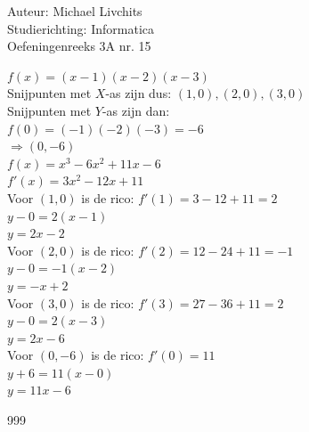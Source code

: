 \documentclass[a4paper]{article}
\begin{document}
  
\noindent \large Auteur: Michael Livchits \\
\noindent \large Studierichting: Informatica\\
\noindent \large Oefeningenreeks 3A nr. 15\\

\medskip

\normalsize

$f(x)=(x-1)(x-2)(x-3)$\\

Snijpunten met $X$-as zijn dus: $(1,0), (2,0), (3,0)$\\

Snijpunten met $Y$-as zijn dan:\\

$f(0)=(-1)(-2)(-3)=-6$\\

$\Rightarrow (0,-6)$\\

$f(x)=x^3-6x^2+11x-6$\\

$f'(x)=3x^2-12x+11$\\

Voor $(1,0)$ is de rico: $f'(1)=3-12+11=2$\\

$y-0=2(x-1)$\\

$y=2x-2$\\

Voor $(2,0)$ is de rico: $f'(2)=12-24+11=-1$\\

$y-0=-1(x-2)$\\

$y=-x+2$\\

Voor $(3,0)$ is de rico: $f'(3)=27-36+11=2$\\

$y-0=2(x-3)$\\

$y=2x-6$\\

Voor $(0,-6)$ is de rico: $f'(0)=11$\\

$y+6=11(x-0)$\\

$y=11x-6$\\

\begin{thebibliography}{999}
\end{thebibliography}
\end{document}
